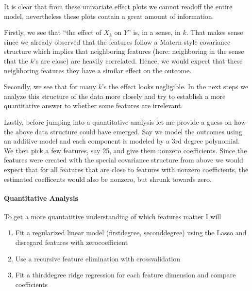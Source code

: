 \documentclass[letterpaper,10pt,english]{sphinxmanual}
\begin{document}
It is clear that from these univariate effect plots we cannot read\sphinxhyphen{}off the entire model, nevertheless these plots contain a great amount of information.

Firstly, we see that “the effect of \(X_k\) on \(Y\)” is, in a sense,  in \(k\).
That makes sense since we already observed that the features follow a Matern style covariance structure which implies that neighboring features (here: neighboring in the sense that the \(k\)’s are close) are heavily correlated.
Hence, we would expect that these neighboring features  they have a similar effect on the outcome.

Secondly, we see that for many \(k\)’s the effect looks negligible.
In the next steps we analyze this structure of the data more closely and try to establish a more quantitative answer to whether some features are irrelevant.

Lastly, before jumping into a quantitative analysis let me provide a guess on how the above data structure could have emerged.
Say we model the outcomes using an additive model and each component is modeled by a 3rd degree polynomial.
We then pick a few features, say 2\sphinxhyphen{}5, and give them non\sphinxhyphen{}zero coefficients.
Since the features were created with the special covariance structure from above we would expect that for all features that are close to features with non\sphinxhyphen{}zero coefficients, the estimated coefficents would also be non\sphinxhyphen{}zero, but shrunk towards zero.


\paragraph{Quantitative Analysis}
\label{\detokenize{simulated_reverse_engineering:quantitative-analysis}}
To get a more quantatitive understanding of which features matter I will
\begin{enumerate}
%
\item {} 
Fit a regularized linear model (first\sphinxhyphen{}degree, second\sphinxhyphen{}degree) using the Lasso and disregard features with zero\sphinxhyphen{}coefficient

\item {} 
Use a recursive feature elimination with cross\sphinxhyphen{}validation

\item {} 
Fit a third\sphinxhyphen{}degree ridge regression for each feature dimension and compare coefficients

\end{enumerate}
\end{document}
